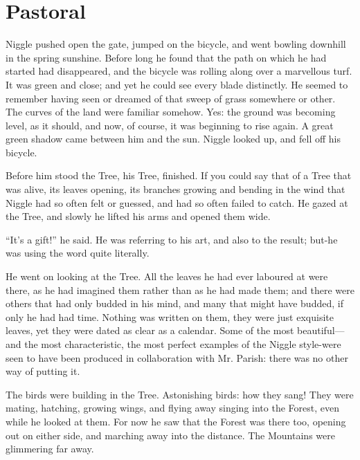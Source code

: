 \documentclass[english]{scrartcl}
\begin{document}
\section*{Pastoral}

Niggle pushed open the gate, jumped on the bicycle, and went bowling downhill in the spring sunshine. Before long he found that the path on which he had started had disappeared, and the bicycle was rolling along over a marvellous turf. It was green and close; and yet he could see every blade distinctly. He seemed to remember having seen or dreamed of that sweep of grass somewhere or other. The curves of the land were familiar somehow. Yes: the ground was becoming level, as it should, and now, of course, it was beginning to rise again. A great green shadow came between him and the sun. Niggle looked up, and fell off his bicycle.

Before him stood the Tree, his Tree, finished. If you could say that of a Tree that was alive, its leaves opening, its branches growing and bending in the wind that Niggle had so often felt or guessed, and had so often failed to catch. He gazed at the Tree, and slowly he lifted his arms and opened them wide.

“It’s a gift!” he said. He was referring to his art, and also to the result; but-he was using the word quite literally.

He went on looking at the Tree. All the leaves he had ever laboured at were there, as he had imagined them rather than as he had made them; and there were others that had only budded in his mind, and many that might have budded, if only he had had time. Nothing was written on them, they were just exquisite leaves, yet they were dated as clear as a calendar. Some of the most beautiful—and the most characteristic, the most perfect examples of the Niggle style-were seen to have been produced in collaboration with Mr. Parish: there was no other way of putting it.

The birds were building in the Tree. Astonishing birds: how they sang! They were mating, hatching, growing wings, and flying away singing into the Forest, even while he looked at them. For now he saw that the Forest was there too, opening out on either side, and marching away into the distance. The Mountains were glimmering far away.
\end{document}
